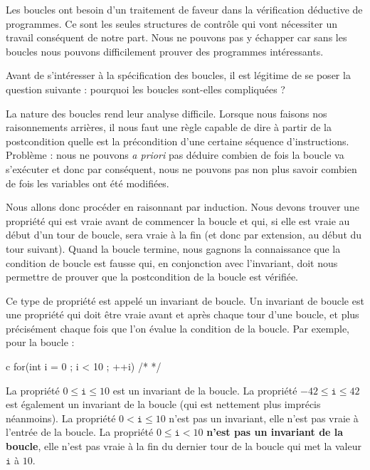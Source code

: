 Les boucles ont besoin d'un traitement de faveur dans la vérification déductive
de programmes. Ce sont les seules structures de contrôle qui vont nécessiter un
travail conséquent de notre part. Nous ne pouvons pas y échapper car sans les 
boucles nous pouvons difficilement prouver des programmes intéressants.



Avant de s'intéresser à la spécification des boucles, il est légitime de se 
poser la question suivante : pourquoi les boucles sont-elles compliquées ?



\label{l3:statements-loops-invariant}


La nature des boucles rend leur analyse difficile. Lorsque nous faisons nos 
raisonnements arrières, il nous faut une règle capable de dire à partir de la
postcondition quelle est la précondition d'une certaine séquence 
d'instructions. Problème : nous ne pouvons \textit{a priori} pas déduire combien de 
fois la boucle va s'exécuter et donc par conséquent, nous ne pouvons pas non 
plus savoir combien de fois les variables ont été modifiées.



Nous allons donc procéder en raisonnant par induction. Nous devons trouver une
propriété qui est vraie avant de commencer la boucle et qui, si elle est vraie
au début d'un tour de boucle, sera vraie à la fin (et donc par extension, au 
début du tour suivant). Quand la boucle termine, nous gagnons la connaissance 
que la condition de boucle est fausse qui, en conjonction avec l'invariant,
doit nous permettre de prouver que la postcondition de la boucle est vérifiée.



Ce type de propriété est appelé un invariant de boucle. Un invariant de boucle
est une propriété qui doit être vraie avant et après chaque tour d'une boucle,
et plus précisément chaque fois que l'on évalue la condition de la boucle.
Par exemple, pour la boucle :



\begin{CodeBlock}{c}
for(int i = 0 ; i < 10 ; ++i){ /* */ }
\end{CodeBlock}



La propriété $0 \leq \texttt{i} \leq 10$ est un invariant de la boucle. La 
propriété  $-42 \leq \texttt{i} \leq 42$ est également un invariant de la boucle
(qui est nettement plus imprécis néanmoins). La propriété $0 < \texttt{i} \leq 10$
n'est pas un invariant, elle n'est pas vraie à l'entrée de la boucle. La propriété
$0 \leq \texttt{i} < 10$ \textbf{n'est pas un invariant de la boucle}, elle n'est
pas vraie à la fin du dernier tour de la boucle qui met la valeur $\texttt{i}$ à 
$10$.



